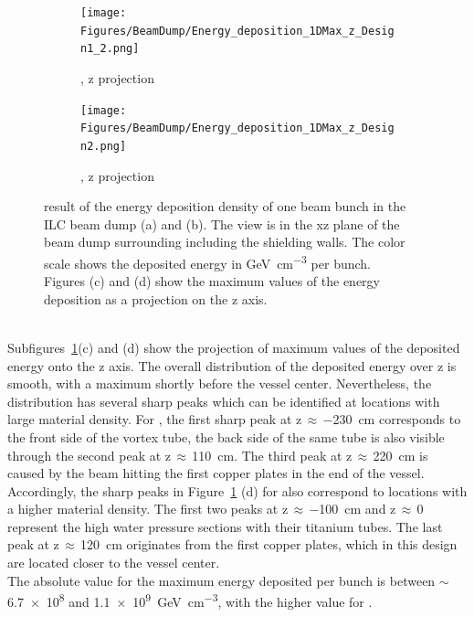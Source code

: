 \begin{figure}[!hb]
\begin{subfigure}[b]{0.485\textwidth}
   \centering
    \texttt{[image: Figures/BeamDump/Energy\_deposition\_1DMax\_z\_Design1\_2.png]}
   \caption{\designone, z projection}
   \end{subfigure}
   \hfill
    \begin{subfigure}[b]{0.485\textwidth}
   \centering
    \texttt{[image: Figures/BeamDump/Energy\_deposition\_1DMax\_z\_Design2.png]}
   \caption{\designtwo, z projection}
   \end{subfigure}
   \caption[Energy deposition in the ILC main beam dump]{\fluka result of the energy deposition density of one beam bunch in the ILC beam dump \designone (a) and \designtwo (b).
   The view is in the xz plane of the beam dump surrounding including the shielding walls.
   The color scale shows the deposited energy in \si{\GeV\per\centi\meter\cubed} per bunch.
   \\Figures (c) and (d) show the maximum values of the energy deposition as a projection on the z axis.}
   \label{fig:BeamDumps:Energy}
\end{figure}
\\Subfigures~\ref{fig:BeamDumps:Energy}(c) and (d) show the projection of maximum values of the deposited energy onto the z axis.
The overall distribution of the deposited energy over z is smooth, with a maximum shortly before the vessel center.
Nevertheless, the distribution has several sharp peaks which can be identified at locations with large material density.
For \designone, the first sharp peak at z\,$\approx$\,\SI{-230}{\centi\meter} corresponds to the front side of the vortex tube, the back side of the same tube is also visible through the second peak at z\,$\approx$\,\SI{110}{\centi\meter}.
The third peak at z\,$\approx$\,\SI{220}{\centi\meter} is caused by the beam hitting the first copper plates in the end of the vessel.
\\Accordingly, the sharp peaks in Figure~\ref{fig:BeamDumps:Energy} (d) for \designtwo also correspond to locations with a higher material density.
The first two peaks at z\,$\approx$\,\SI{-100}{\centi\meter} and z\,$\approx$\,0 represent the high water pressure sections with their titanium tubes.
The last peak at z\,$\approx$\,\SI{120}{\centi\meter} originates from the first copper plates, which in this design are located closer to the vessel center.
\\The absolute value for the maximum energy deposited per bunch is between $\sim$\num{6.7e8} and \SI{1.1e9}{\GeV\per\centi\meter\cubed}, with the higher value for \designtwo.
 
